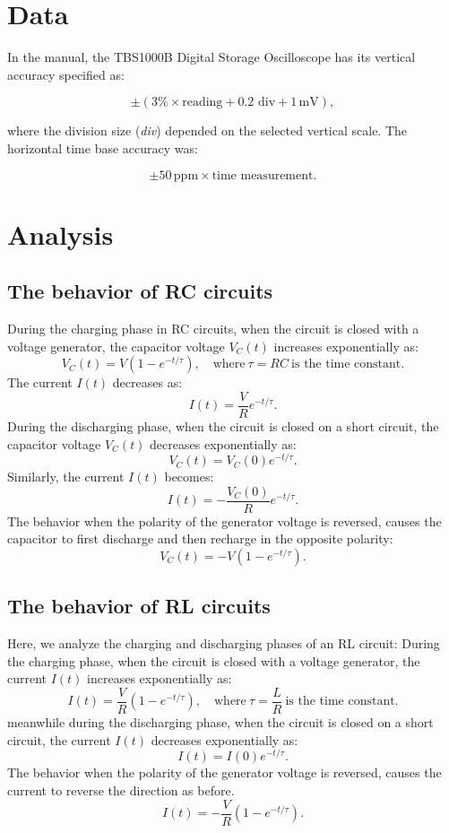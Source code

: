 \documentclass[notitlepage]{report}
\numberwithin{equation}{section}
\theoremstyle{plain}
\theoremstyle{definition}
\theoremstyle{remark}
\begin{document}
\section{Data}  

In the manual, the TBS1000B Digital Storage Oscilloscope has its vertical accuracy specified as:

\[
\pm \left(3\% \times \text{reading} + 0.2 \text{ div} + 1 \, \text{mV}\right),
\]

where the division size (\textit{div}) depended on the selected vertical scale. The horizontal time base accuracy was:

\[
\pm 50 \, \text{ppm} \times \text{time measurement}.
\]


   \section{Analysis}

   \subsection{The behavior of RC circuits}

During the charging phase in RC circuits, when the circuit is closed with a voltage generator, the capacitor voltage \( V_C(t) \) increases exponentially as:
        \[
        V_C(t) = V \left(1 - e^{-t / \tau}\right), \quad \text{where} \ \tau = RC \ \text{is the time constant.}
        \]
        The current \( I(t) \) decreases as:
        \[
        I(t) = \frac{V}{R} e^{-t / \tau}.
        \]
        During the discharging phase, when the circuit is closed on a short circuit, the capacitor voltage \( V_C(t) \) decreases exponentially as:
        \[
        V_C(t) = V_C(0) e^{-t / \tau}.
        \]
        Similarly, the current \( I(t) \) becomes:
        \[
        I(t) = -\frac{V_C(0)}{R} e^{-t / \tau}.
        \]
        The behavior when the polarity of the generator voltage is reversed, causes the capacitor to first discharge and then recharge in the opposite polarity:
        \[
        V_C(t) = -V \left(1 - e^{-t / \tau}\right).
        \]
    \subsection{The behavior of RL circuits}
    Here, we analyze the charging and discharging phases of an RL circuit:
During the charging phase, when the circuit is closed with a voltage generator, the current \( I(t) \) increases exponentially as:
        \[
        I(t) = \frac{V}{R} \left(1 - e^{-t / \tau}\right), \quad \text{where} \ \tau = \frac{L}{R} \ \text{is the time constant.}
        \]
        meanwhile during the discharging phase, when the circuit is closed on a short circuit, the current \( I(t) \) decreases exponentially as:
        \[
        I(t) = I(0) e^{-t / \tau}.
        \]
        The behavior when the polarity of the generator voltage is reversed, causes the current to reverse the direction as before.
        \[
        I(t) = -\frac{V}{R} \left(1 - e^{-t / \tau}\right).
        \]
\end{document}
